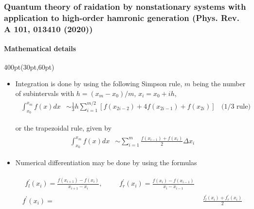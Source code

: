\begin{frame}
\frametitle{Quantum theory of raidation by nonstationary systems 
	with application to high-order hamronic generation
        (Phys. Rev. A 101, 013410 (2020))}
	\framesubtitle{Mathematical details}
\small

\begin{textblock*}{400pt}(30pt,60pt)
\footnotesize
\begin{itemize}
\item Integration is done by using the following Simpson rule,
$m$ being the number of subintervals
with $h=(x_{m}-x_0)/m$, $x_i = x_0 + ih$,
\begin{align}
\begin{split}
 \int_{x_0}^{x_m} f(x)dx & \sim \frac{1}{3} h \sum_{i=1}^{m/2}
  \left[ f(x_{2i-2})  + 4f(x_{2i-1}) + f(x_{2i})\right]\;\;\mbox{ (1/3 rule) }
\end{split} \label{eqn:simps18} 
\end{align}

or the trapezoidal rule, given by
\begin{align}
\begin{split}
 \int_{x_0}^{x_m} f(x)dx 
   & \sim \sum_{i=1}^{m} \frac{ f(x_{i-1})  + f(x_{i})}{2}\Delta x_i
\end{split} \label{eqn:trapez} 
\end{align}

\item Numerical differentiation may be done by using the formulas

\begin{align}
\begin{split}
f^{\prime}_l (x_i) = \frac{f(x_{i+1}) -  f(x_i)}{x_{i+1} -x_i}, & \hspace{20pt}
f^{\prime}_r (x_i) = \frac{f(x_{i}) -  f(x_{i-1})}{x_{i} - x_{i-1}}
\end{split} \label{eqn:diff}   \\
f^{\prime} (x_i) = & \frac{f^{\prime}_l (x_i) + f^{\prime}_r (x_i)}{2}
\end{align}

  
\end{itemize}

\end{textblock*}


\end{frame}







